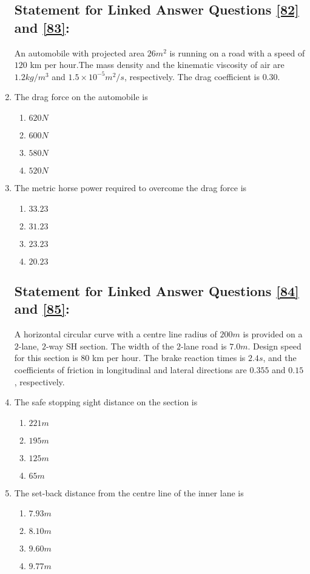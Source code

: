 \documentclass[journal]{IEEEtran}
\begin{document}
\begin{enumerate}
    \subsection*{Statement for Linked Answer Questions \ref{82} and \ref{83}:}
    An automobile with projected area $26m^2$ is running on a road with a speed of $120$ km per hour.The mass density and the kinematic viscosity of air are $1.2 kg/m^3$ and $1.5\times 10^{-5} m^2/s$, respectively. The drag coefficient is $0.30$.
    \item \label{82} The drag force on the automobile is
        \begin{enumerate}
            \item $620N$
            \item $600N$
            \item $580N$
            \item $520N$
        \end{enumerate}

    \item \label{83} The metric horse power required to overcome the drag force is 
        \begin{enumerate}
            \item $33.23$
            \item $31.23$
            \item $23.23$
            \item $20.23$
        \end{enumerate}

    \subsection*{Statement for Linked Answer Questions \ref{84} and \ref{85}:}
    A horizontal circular curve with a centre line radius of $200 m$ is provided on a $2$-lane, $2$-way SH section. The width of the $2$-lane road is $7.0 m$. Design speed for this section is $80$ km per hour. The brake reaction times is $2.4 s$, and the coefficients of friction in longitudinal and lateral directions are $0.355$ and $0.15$, respectively.
    \item \label{84} The safe stopping sight distance on the section is 
        \begin{enumerate}
            \item $221m$
            \item $195m$
            \item $125m$
            \item $65m$
        \end{enumerate}

    \item \label{85} The set-back distance from the centre line of the inner lane is 
        \begin{enumerate}
            \item $7.93m$
            \item $8.10m$
            \item $9.60m$
            \item $9.77m$
        \end{enumerate}
\end{enumerate}


  
\end{document}

